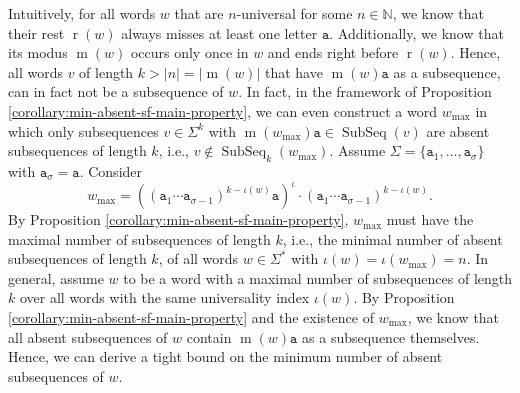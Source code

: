 \documentclass[10pt,a4paper]{amsart}
\newcommand{\N}{\mathbb{N}}
\def\ta{\mathtt{a}}
\def\r{\operatorname{r}}
\def\m{\operatorname{m}}
\DeclareMathOperator\ScatFact{SubSeq}
\theoremstyle{plain}
\theoremstyle{definition}
\begin{document}
Intuitively, for all words $w$ that are $n$-universal for some $n\in\N$, we know that their rest $\r(w)$ always misses at least one letter $\ta$. Additionally, we know that its modus $\m(w)$ occurs only once in $w$ and ends right before $\r(w)$. Hence, all words $v$ of length $k > |n| = |\m(w)|$ that have $\m(w)\ta$ as a subsequence, can in fact not be a subsequence of $w$. In fact, in the framework of Proposition \ref{corollary:min-absent-sf-main-property}, we can even construct a word $w_{\max}$ in which only subsequences $v\in\Sigma^k$ with $\m(w_{\max})\ta\in\ScatFact(v)$ are absent subsequences of length $k$, i.e., $v\notin\ScatFact_k(w_{\max})$. Assume $\Sigma=\{\ta_1,\ldots,\ta_\sigma\}$ with $\ta_\sigma = \ta$. Consider 
$$ w_{\max}=((\ta_1 \cdots \ta_{\sigma-1})^{k-\iota(w)} \ta)^\iota \cdot (\ta_1 \cdots \ta_{\sigma-1})^{k-\iota(w)}.$$ 
By Proposition \ref{corollary:min-absent-sf-main-property}, $w_{\max}$ must have the maximal number of subsequences of length $k$, i.e., the minimal number of absent subsequences of length $k$, of all words $w\in\Sigma^*$ with $\iota(w) = \iota(w_{\max}) = n$.
In general, assume $w$ to be a word with a maximal number of subsequences of length $k$ over all words with the same universality index $\iota(w)$. By Proposition \ref{corollary:min-absent-sf-main-property} and the existence of $w_{\max}$, we know that all absent subsequences of $w$ contain $\m(w)\ta$ as a subsequence themselves. Hence, we can derive a tight bound on the minimum number of absent subsequences of $w$. %
\end{document}
